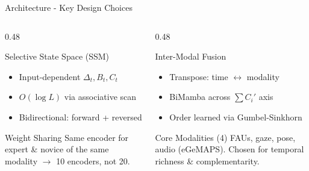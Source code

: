 \documentclass[aspectratio=169]{beamer}
\begin{document}
	\begin{frame}{Architecture - Key Design Choices}
		\begin{columns}[onlytextwidth]
			\begin{column}{0.48\textwidth}
				\begin{block}{Selective State Space (SSM)}
					\small
					\begin{itemize}
						\item Input-dependent $\Delta_t, B_t, C_t$
						\item $O(\log L)$ via associative scan
						\item Bidirectional: forward + reversed
					\end{itemize}
				\end{block}
				\begin{block}{Weight Sharing}
					\small
					Same encoder for expert \& novice of the same modality $\to$ 10 encoders, not 20.
				\end{block}
			\end{column}
			\begin{column}{0.48\textwidth}
				\begin{block}{Inter-Modal Fusion}
					\small
					\begin{itemize}
						\item Transpose: time $\leftrightarrow$ modality
						\item BiMamba across $\sum C_i'$ axis
						\item Order learned via Gumbel-Sinkhorn
					\end{itemize}
				\end{block}
				\begin{block}{Core Modalities (4)}
					\small
					FAUs, gaze, pose, audio (eGeMAPS). Chosen for temporal richness \& complementarity.
				\end{block}
			\end{column}
		\end{columns}
	\end{frame}
\end{document}
